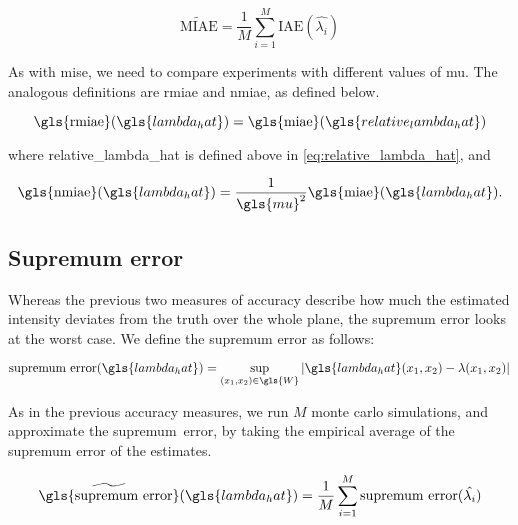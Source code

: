 \begin{equation}
    \widetilde{\mbox{MIAE}} = \frac{1}{M} \sum_{i=1}^{M} \mbox{IAE}(\hat{\lambda_i})
\end{equation}

As with \gls{mise}, we need to compare experiments with different values of \gls{mu}.
The analogous definitions are \gls{rmiae} and \gls{nmiae}, as defined below.

\begin{equation}
\label{eq:rmiae}
    \mbox{\gls{rmiae}}(\gls{lambda_hat}) = 
        \mbox{\gls{miae}}(\gls{relative_lambda_hat}) \\
\end{equation}

where \gls{relative_lambda_hat} is defined above in \cref{eq:relative_lambda_hat},
and

\begin{equation}
\label{eq:nmiae}
    \mbox{\gls{nmiae}}(\gls{lambda_hat}) = 
        \frac{1}{\gls{mu}^2} \mbox{\gls{miae}}(\gls{lambda_hat}) \text{.}
\end{equation}


\subsection{Supremum error}
\label{subsec:method:sup_error}

Whereas the previous two measures of accuracy describe how much the estimated intensity deviates from the truth over the whole plane,
the \gls{supremum error} looks at the worst case.
We define the \gls{supremum error} as follows:

\begin{equation}
    \mbox{supremum error}(\gls{lambda_hat}) = \sup_{(x_1, x_2) \in \gls{W}}
        {\left|
            \gls{lambda_hat}(x_1, x_2) - \lambda(x_1, x_2)
        \right|}
\end{equation}

As in the previous accuracy measures, we run \(M\) monte carlo simulations, and approximate the \mbox{supremum error}, by taking the empirical average of the supremum error of the estimates.

\begin{equation}
    \widetilde{\mbox{\gls{supremum error}}}(\gls{lambda_hat}) = \frac{1}{M} \sum_{i=1}^{M} \mbox{supremum error}(\hat{\lambda_i})
\end{equation}

